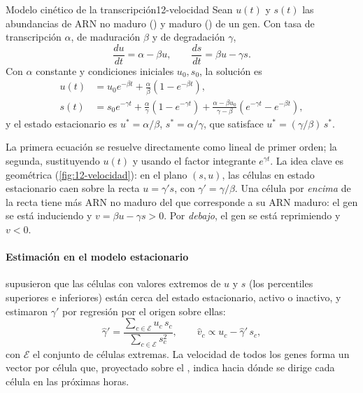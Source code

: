 \begin{teorema}{Modelo cinético de la transcripción}{12-velocidad}
Sean $u(t)$ y $s(t)$ las abundancias de ARN no maduro () y maduro () de un gen. Con tasa de transcripción $\alpha$, de maduración $\beta$ y de degradación $\gamma$,
\begin{equation}\label{eq:12-ode}
\frac{du}{dt}=\alpha-\beta u,\qquad \frac{ds}{dt}=\beta u-\gamma s.
\end{equation}
Con $\alpha$ constante y condiciones iniciales $u_0,s_0$, la solución es
\begin{equation}\label{eq:12-ode-sol}
\begin{aligned}
u(t)&=u_0e^{-\beta t}+\frac{\alpha}{\beta}\left(1-e^{-\beta t}\right),\\
s(t)&=s_0e^{-\gamma t}+\frac{\alpha}{\gamma}\left(1-e^{-\gamma t}\right)+\frac{\alpha-\beta u_0}{\gamma-\beta}\left(e^{-\gamma t}-e^{-\beta t}\right),
\end{aligned}
\end{equation}
y el estado estacionario es $u^*=\alpha/\beta$, $s^*=\alpha/\gamma$, que satisface $u^*=(\gamma/\beta)\,s^*$.
\end{teorema}
\begin{simbolos}
\end{simbolos}
La primera ecuación se resuelve directamente como lineal de primer orden; la segunda, sustituyendo $u(t)$ y usando el factor integrante $e^{\gamma t}$. La idea clave es geométrica (\cref{fig:12-velocidad}): en el plano $(s,u)$, las células en estado estacionario caen sobre la recta $u=\gamma' s$, con $\gamma'=\gamma/\beta$. Una célula por \emph{encima} de la recta tiene más ARN no maduro del que corresponde a su ARN maduro: el gen se está induciendo y $v=\beta u-\gamma s>0$. Por \emph{debajo}, el gen se está reprimiendo y $v<0$.

\paragraph{Estimación en el modelo estacionario} \textcite{c12-lamanno2018} supusieron que las células con valores extremos de $u$ y $s$ (los percentiles superiores e inferiores) están cerca del estado estacionario, activo o inactivo, y estimaron $\gamma'$ por regresión por el origen sobre ellas:
\begin{equation}\label{eq:12-gamma}
\hat\gamma'=\frac{\sum_{c\in\mathcal{E}}u_c\,s_c}{\sum_{c\in\mathcal{E}}s_c^2},\qquad \hat v_c\propto u_c-\hat\gamma'\,s_c,
\end{equation}
con $\mathcal{E}$ el conjunto de células extremas. La velocidad de todos los genes forma un vector por célula que, proyectado sobre el , indica hacia dónde se dirige cada célula en las próximas horas.

